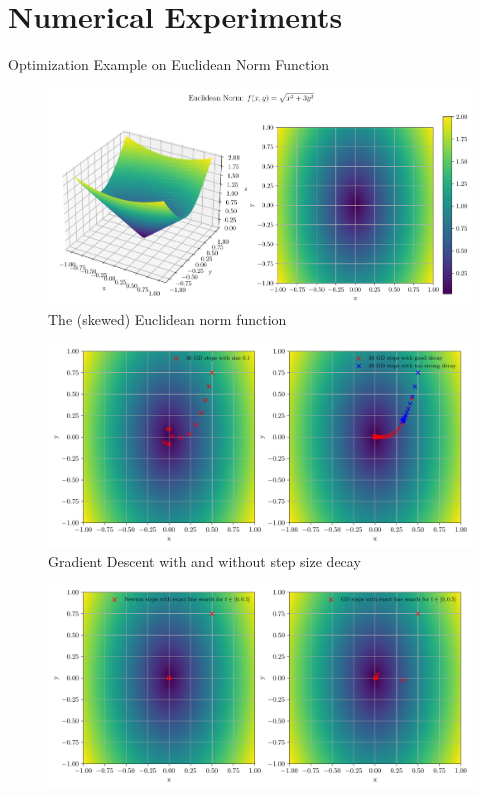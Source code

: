 \documentclass{beamer}
\begin{document}
\section{Numerical Experiments}
\begin{frame}{Optimization Example on Euclidean Norm Function}
     {
        \begin{figure}
            \centering
            \includegraphics[width=1.0\textwidth]{plots/euclidean_norm.pdf}
            \caption{The (skewed) Euclidean norm function}
            \label{fig:euclidean_norm_function}
        \end{figure}
    }
     {
        \begin{figure}
            \centering
            \includegraphics[width=1.0\textwidth]{plots/gd_steps.pdf}
            \caption{Gradient Descent with and without
                step size decay}
            \label{fig:gd_steps}
        \end{figure}
    }
     {
        \begin{figure}
            \centering
            \includegraphics[width=1.0\textwidth]{plots/exact_line_search_newton_vs_gd.pdf}

\end{figure}}
\end{frame}
\end{document}
